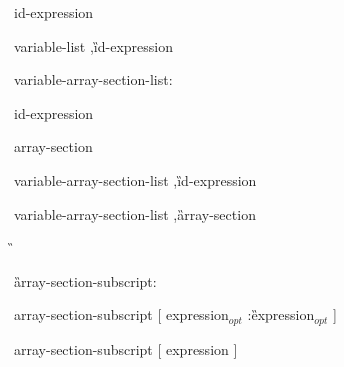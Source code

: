 {\I id-expression

\I variable-list \C ,\G id-expression

variable-array-section-list:

\I id-expression

\I array-section

\I variable-array-section-list \C ,\G id-expression

\I variable-array-section-list \C ,\G array-section

\G\cppspecificend

\G array-section-subscript:

\I array-section-subscript [ expression$_{opt}$ \C :\G expression$_{opt}$ ]

\I array-section-subscript [ expression ]


\I [ expression ]

} %


